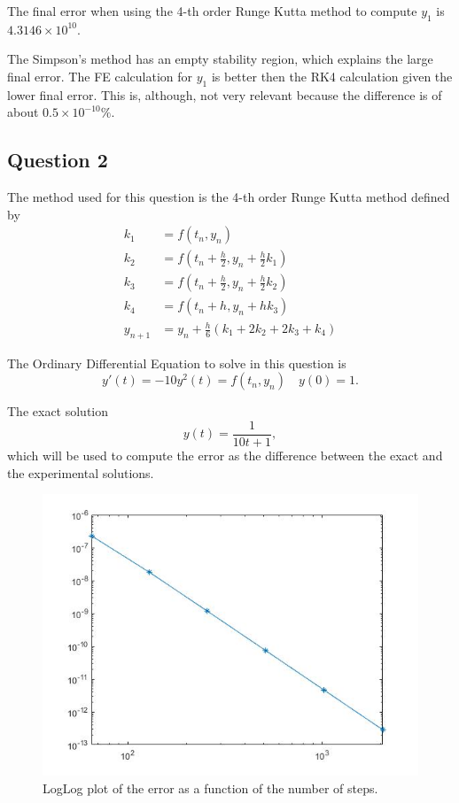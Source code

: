 \documentclass[a4paper, 11pt]{article}
\begin{document}
		The final error when using the 4-th order Runge Kutta method to compute $y_1$ is $4.3146 \times 10^{10}$.
		
		The Simpson's method has an empty stability region, which explains the large final error.
		The FE calculation for $y_1$ is better then the RK4 calculation given the lower final error.
		This is, although, not very relevant because the difference is of about $ 0.5 \times 10^{-10} \% $.
		
		\subsection*{Question 2}
		The method used for this question is the 4-th order Runge Kutta method defined by
		\begin{align}
			k_1 &= f(t_n,y_n) \\
			k_2 &= f\left(t_n+\frac{h}{2},y_n + \frac{h}{2}k_1\right) \\
			k_3 &= f\left(t_n+\frac{h}{2},y_n + \frac{h}{2}k_2\right)\\
			k_4 &= f\left(t_n+h,y_n + hk_3\right) \\
			y_{n+1} &= y_n + \frac{h}{6} \left(k_1 + 2k_2 + 2k_3 + k_4 \right)
		\end{align}
	
		The Ordinary Differential Equation to solve in this question is 
		\begin{equation}
			y'(t) = -10y^2(t) = f(t_n,y_n)	\quad y(0) =1.
		\end{equation}
	
		The exact solution
		\begin{equation}
			y(t) = \frac{1}{10t + 1},
		\end{equation}
		which will be used to compute the error as the difference between the exact and the experimental solutions.
		
		\begin{figure}[H]
			\centering
			\includegraphics[width=\linewidth]{ex2.jpg}
			\caption{LogLog plot of the error as a function of the number of steps.}
			\label{fig:ex2}
		\end{figure}
		
\end{document}

